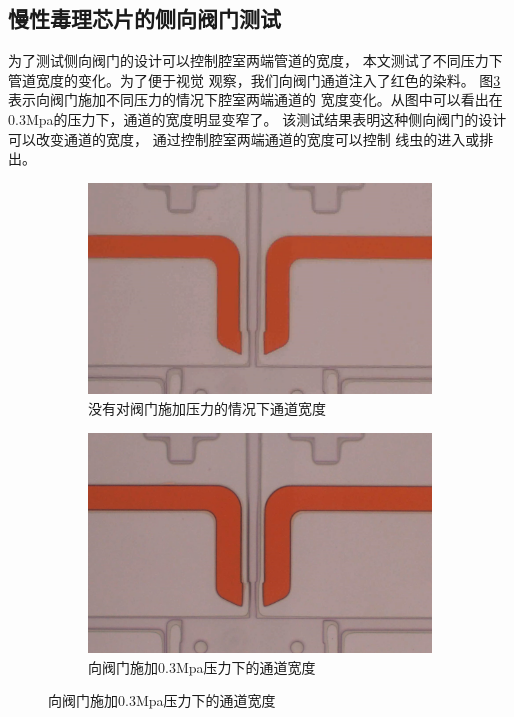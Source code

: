 \subsection{慢性毒理芯片的侧向阀门测试}
	为了测试侧向阀门的设计可以控制腔室两端管道的宽度，
	本文测试了不同压力下管道宽度的变化。为了便于视觉
	观察，我们向阀门通道注入了红色的染料。
	图\ref{fig:chap1:width}表示向阀门施加不同压力的情况下腔室两端通道的
	宽度变化。从图中可以看出在0.3Mpa的压力下，通道的宽度明显变窄了。
	该测试结果表明这种侧向阀门的设计可以改变通道的宽度，
	通过控制腔室两端通道的宽度可以控制
	线虫的进入或排出。
		\begin{figure}[!htp]
	  \centering
	  \begin{subfigure}{0.45\textwidth}
		\centering
		\includegraphics[width=1\linewidth]{figure/chap1/singlelayertest1.jpg}
		\caption{没有对阀门施加压力的情况下通道宽度}
		\label{fig:before1}   
	  \end{subfigure}
		\hspace{1em}
	  \begin{subfigure}{0.45\textwidth}
		\centering
		\includegraphics[width=1\linewidth]{figure/chap1/singlelayertest2.jpg}
		\caption{向阀门施加0.3Mpa压力下的通道宽度}
		\label{fig:after1}
	  \end{subfigure}
	  \label{fig:chap1:width}
	\end{figure}
